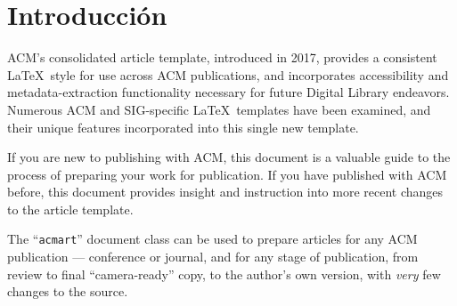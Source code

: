 \section{Introducción}
ACM's consolidated article template, introduced in 2017, provides a
consistent \LaTeX\ style for use across ACM publications, and
incorporates accessibility and metadata-extraction functionality
necessary for future Digital Library endeavors. Numerous ACM and
SIG-specific \LaTeX\ templates have been examined, and their unique
features\cite{ibm-sl} incorporated into this single new template.

If you are new to publishing with ACM, this document is a valuable
guide to the process of preparing your work for publication. If you
have published with ACM before, this document provides insight and
instruction into more \cite{ibm-ml} recent changes to the article template.

The ``\verb|acmart|'' document class can be used to prepare articles
for any ACM publication --- conference or journal, and for any stage
of publication, from\cite{ibm-usl} review to final ``camera-ready'' copy, to the
author's own version, with {\itshape very} few changes to the source.

